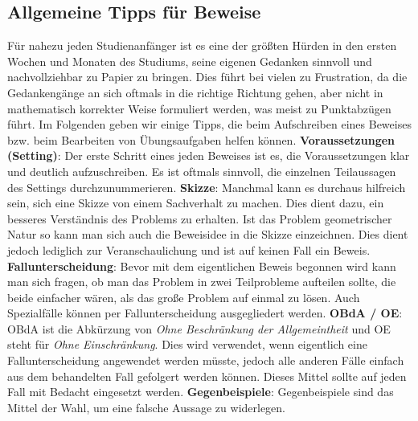 \subsection{Allgemeine Tipps für Beweise}

Für nahezu jeden Studienanfänger ist es eine der größten Hürden in den ersten Wochen und Monaten des Studiums, seine eigenen Gedanken sinnvoll und nachvollziehbar zu Papier zu bringen.
Dies führt bei vielen zu Frustration, da die Gedankengänge an sich oftmals in die richtige Richtung gehen, aber nicht in mathematisch korrekter Weise formuliert werden, was meist zu Punktabzügen führt. 
Im Folgenden geben wir einige Tipps, die beim Aufschreiben eines Beweises bzw. beim Bearbeiten von Übungsaufgaben helfen können. 
\newline 
\newline 
\textbf{Voraussetzungen (Setting)}:\newline 
Der erste Schritt eines jeden Beweises ist es, die Voraussetzungen klar und deutlich aufzuschreiben. 
Es ist oftmals sinnvoll, die einzelnen Teilaussagen des Settings durchzunummerieren. 
\newline\newline  
\textbf{Skizze}:\newline 
Manchmal kann es durchaus hilfreich sein, sich eine Skizze von einem Sachverhalt zu machen. Dies dient dazu, ein besseres Verständnis des Problems zu erhalten. 
Ist das Problem geometrischer Natur so kann man sich auch die Beweisidee in die Skizze einzeichnen. Dies dient jedoch lediglich zur Veranschaulichung und ist auf keinen Fall ein Beweis. 
\newline\newline 
\textbf{Fallunterscheidung}:\newline
Bevor mit dem eigentlichen Beweis begonnen wird kann man sich fragen, ob man das Problem in zwei Teilprobleme aufteilen sollte, die beide einfacher wären, als das große Problem auf einmal zu lösen. 
Auch Spezialfälle können per Fallunterscheidung ausgegliedert werden. 
\newline\newline 
\textbf{OBdA / OE}:\newline
OBdA ist die Abkürzung von \textit{Ohne Beschränkung der Allgemeintheit} und OE steht für \textit{Ohne Einschränkung}. Dies wird verwendet, wenn eigentlich eine Fallunterscheidung angewendet werden müsste, jedoch alle anderen Fälle einfach aus dem behandelten Fall gefolgert werden können. 
Dieses Mittel sollte auf jeden Fall mit Bedacht eingesetzt werden. 
\newline\newline 
\textbf{Gegenbeispiele}:\newline
Gegenbeispiele sind das Mittel der Wahl, um eine falsche Aussage zu widerlegen. 
\newline\newline 


